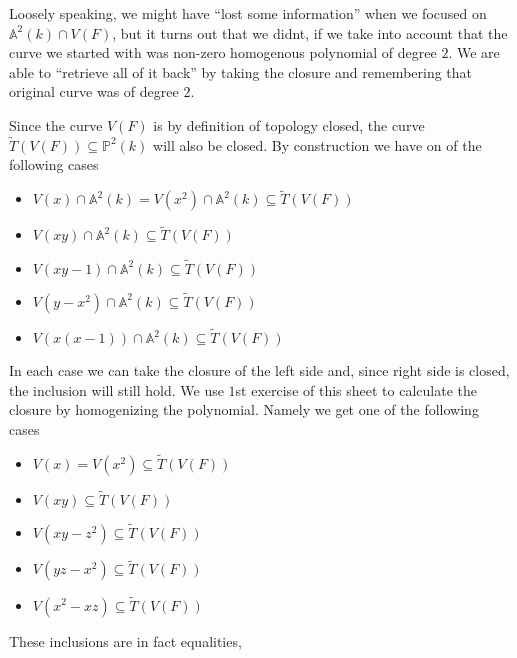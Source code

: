 \begin{exercise}{2}
\begin{enumerate}
            Loosely speaking, we might have ``lost some information'' when we
            focused on $\mathbb{A}^2(k) \cap V(F)$, but it turns out that we
            didnt, if we take into account that the curve we started with was
            non-zero homogenous polynomial of degree $2$. We are able to
            ``retrieve all of it back'' by taking the closure and remembering
            that original curve was of degree $2$.

            Since the curve $V(F)$ is by definition of topology closed, the
            curve $\widetilde{T}(V(F)) \subseteq \mathbb{P}^2(k)$ will also be
            closed. By construction we have on of the following cases
            \begin{itemize}
                \item{} $V(x) \cap \mathbb{A}^2(k) = V(x^2) \cap \mathbb{A}^2(k)
                    \subseteq \widetilde{T}(V(F))$
                \item{} $V(xy) \cap \mathbb{A}^2(k) \subseteq
                    \widetilde{T}(V(F))$
                \item{} $V(xy - 1) \cap \mathbb{A}^2(k) \subseteq
                    \widetilde{T}(V(F))$
                \item{} $V(y - x^2) \cap \mathbb{A}^2(k) \subseteq
                    \widetilde{T}(V(F))$
                \item{} $V(x(x - 1)) \cap \mathbb{A}^2(k) \subseteq
                    \widetilde{T}(V(F))$
            \end{itemize}
            In each case we can take the closure of the left side and, since
            right side is closed, the inclusion will still hold. We use $1$st
            exercise of this sheet to calculate the closure by homogenizing the
            polynomial. Namely we get one of the following cases
            \begin{itemize}
                \item{} $V(x) = V(x^2) \subseteq \widetilde{T}(V(F))$
                \item{} $V(xy) \subseteq \widetilde{T}(V(F))$
                \item{} $V(xy - z^2) \subseteq \widetilde{T}(V(F))$
                \item{} $V(yz - x^2) \subseteq \widetilde{T}(V(F))$
                \item{} $V(x^2 - xz) \subseteq \widetilde{T}(V(F))$
            \end{itemize}
            These inclusions are in fact equalities,
    \end{enumerate}
\end{exercise}

